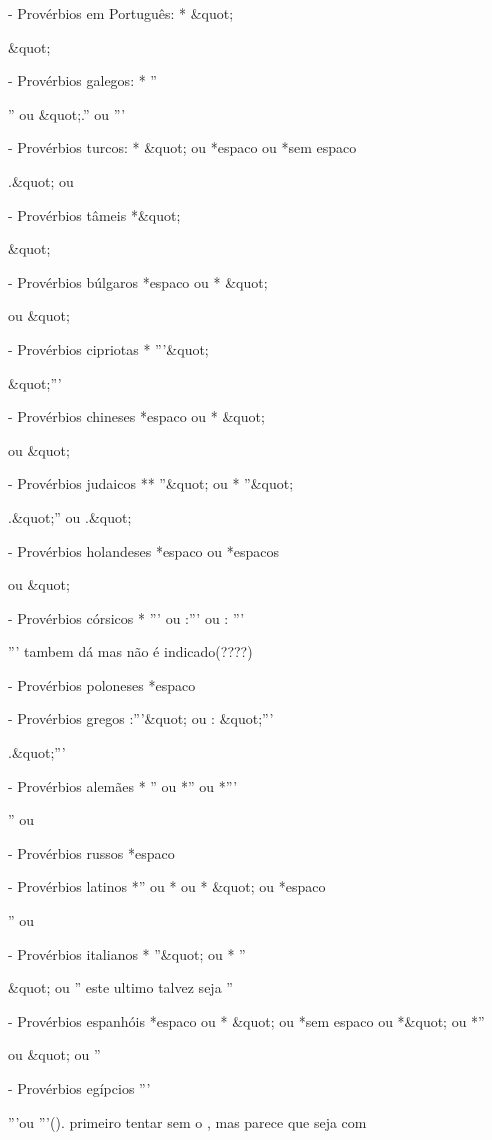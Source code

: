 - Provérbios em Português:
* &quot;

&quot;

- Provérbios galegos:
* ''

'' ou &quot;.'' ou '''

- Provérbios turcos:
* &quot; ou *{espaco} ou *{sem espaco}

.&quot; ou \n

- Provérbios tâmeis
*&quot;

&quot;

- Provérbios búlgaros
*{espaco} ou * &quot;

\n ou &quot;

- Provérbios cipriotas
* '''&quot;

&quot;'''

- Provérbios chineses
*{espaco} ou * &quot;

\n ou &quot;

- Provérbios judaicos
** ''&quot; ou * ''&quot;

.&quot;'' ou .&quot;

- Provérbios holandeses
*{espaco} ou *{espacos}

\n ou &quot;

- Provérbios córsicos
* ''' ou :''' ou : '''

'''                  \n tambem dá mas não é indicado(????)

- Provérbios poloneses
*{espaco}

\n

- Provérbios gregos
:'''&quot; ou : &quot;'''

.&quot;'''

- Provérbios alemães
* '' ou *'' ou *'''

'' ou \n

- Provérbios russos
*{espaco}

\n

- Provérbios latinos
*'' ou * ou * &quot; ou *{espaco}

'' ou \n

- Provérbios italianos
* ''&quot; ou * ''

&quot; ou ''                este ultimo talvez seja ''\n

- Provérbios espanhóis
*{espaco} ou * &quot; ou *{sem espaco} ou *&quot; ou *''

\n ou &quot; ou ''\n

- Provérbios egípcios
'''

'''\n ou '''().               primeiro tentar sem o \n, mas parece que seja com \n

